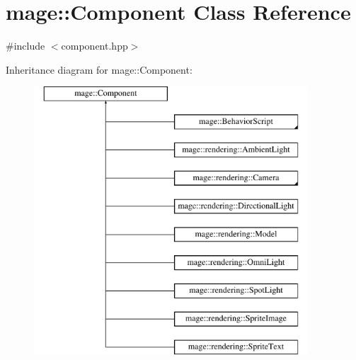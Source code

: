 \hypertarget{classmage_1_1_component}{}\section{mage\+:\+:Component Class Reference}
\label{classmage_1_1_component}


{\ttfamily \#include $<$component.\+hpp$>$}

Inheritance diagram for mage\+:\+:Component\+:\begin{figure}[H]
\begin{center}
\leavevmode
\includegraphics[height=10.000000cm]{classmage_1_1_component}
\end{center}
\end{figure}
